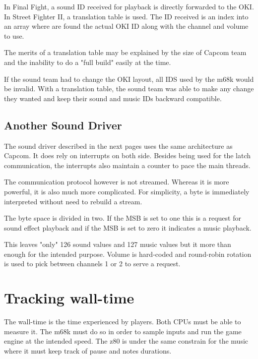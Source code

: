 In Final Fight, a sound ID received for playback is directly forwarded to the OKI. In Street Fighter II, a translation table is used. The ID received is an index into an array where are found the actual OKI ID along with the channel and volume to use.

The merits of a translation table may be explained by the size of Capcom team and the inability to do a "full build" easily at the time.

If the sound team had to change the OKI layout, all IDS used by the m68k would be invalid. With a translation table, the sound team was able to make any change they wanted and keep their sound and music IDs backward compatible.


\subsection{Another Sound Driver}

The sound driver described in the next pages uses the same architecture as Capcom. It does rely on interrupts on both side. Besides being used for the latch communication, the interrupts also maintain a counter to pace the main threads.


The communication protocol however is not streamed. Whereas it is more powerful, it is also much more complicated. For simplicity, a byte is immediately interpreted without need to rebuild a stream.

The byte space is divided in two. If the MSB is set to one  this is a request for sound effect playback and if the MSB is set to zero  it indicates a music playback. 

This leaves "only" 126 sound values and 127 music values but it more than enough for the intended purpose. Volume is hard-coded and round-robin rotation is used to pick between channels 1 or 2 to serve a request. 



\section{Tracking wall-time}
The wall-time is the time experienced by players. Both CPUs must be able to measure it. The m68k must do so in order to sample inputs and run the game engine at the intended speed. The z80 is under the same constrain for the music where it must keep track of pause and notes durations. 

